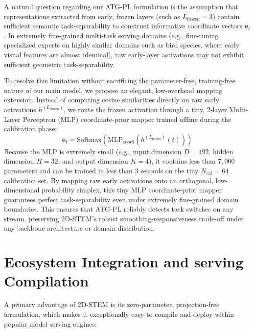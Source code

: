 A natural question regarding our ATG-PL formulation is the assumption that representations extracted from early, frozen layers (such as $L_{\text{frozen}} = 3$) contain sufficient semantic task-separability to construct informative coordinate vectors $\mathbf{e}_t$. In extremely fine-grained multi-task serving domains (e.g., fine-tuning specialized experts on highly similar domains such as bird species, where early visual features are almost identical), raw early-layer activations may not exhibit sufficient geometric task-separability.

To resolve this limitation without sacrificing the parameter-free, training-free nature of our main model, we propose an elegant, low-overhead mapping extension. Instead of computing cosine similarities directly on raw early activations $h^{(L_{\text{frozen}})}$, we route the frozen activation through a tiny, 2-layer Multi-Layer Perceptron (MLP) coordinate-prior mapper trained offline during the calibration phase:
\begin{equation}
    \mathbf{e}_t = \text{Softmax}\left( \text{MLP}_{\text{coord}}\left(h^{(L_{\text{frozen}})}(t)\right) \right)
\end{equation}
Because the MLP is extremely small (e.g., input dimension $D=192$, hidden dimension $H=32$, and output dimension $K=4$), it contains less than $7,000$ parameters and can be trained in less than 3 seconds on the tiny $N_{\text{cal}} = 64$ calibration set. By mapping raw early activations onto an orthogonal, low-dimensional probability simplex, this tiny MLP coordinate-prior mapper guarantees perfect task-separability even under extremely fine-grained domain boundaries. This ensures that ATG-PL reliably detects task switches on any stream, preserving 2D-STEM's robust smoothing-responsiveness trade-off under any backbone architecture or domain distribution.

\section{Ecosystem Integration and serving Compilation}
\label{sec:ecosystem_integration}

A primary advantage of 2D-STEM is its zero-parameter, projection-free formulation, which makes it exceptionally easy to compile and deploy within popular model serving engines:

